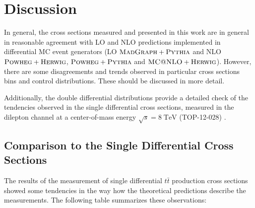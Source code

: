 


\section{Discussion}
In general, the cross sections measured and presented in this work are in general in reasonable agreement with LO and NLO predictions
implemented in differential MC event generators (LO $\textsc{MadGraph}+\textsc{Pythia}$ and NLO $\textsc{Powheg}+\textsc{Herwig}$, $\textsc{Powheg}+\textsc{Pythia}$ and $\textsc{MC@NLO}+\textsc{Herwig}$).
However, there are some disagreements and trends observed in particular cross sections bins and control distributions.
These should be discussed in more detail.

Additionally, the double differential distributions provide a detailed check of the tendencies observed in the single differential
cross sections, measured in the dilepton channel at a center-of-mass energy $\sqrt{s} = 8\;\text{TeV}$ (TOP-12-028) \cite{Khachatryan:2015oqa}.

\subsection{Comparison to the Single Differential Cross Sections}

The results of the measurement of single differential $t\bar{t}$ production cross sections \cite{Khachatryan:2015oqa, Asin2014Auth} showed some 
tendencies in the way how the theoretical predictions describe the measurements. The following table summarizes these observations:

